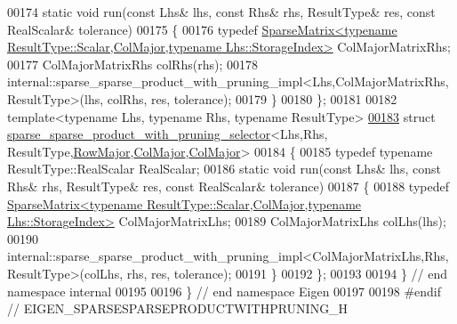 \begin{DoxyCode}
00174   \textcolor{keyword}{static} \textcolor{keywordtype}{void} run(\textcolor{keyword}{const} Lhs& lhs, \textcolor{keyword}{const} Rhs& rhs, ResultType& res, \textcolor{keyword}{const} RealScalar& tolerance)
00175   \{
00176     \textcolor{keyword}{typedef} 
      \hyperlink{group___sparse_core___module_class_eigen_1_1_sparse_matrix}{SparseMatrix<typename ResultType::Scalar,ColMajor,typename Lhs::StorageIndex>}
       ColMajorMatrixRhs;
00177     ColMajorMatrixRhs colRhs(rhs);
00178     internal::sparse\_sparse\_product\_with\_pruning\_impl<Lhs,ColMajorMatrixRhs,ResultType>(lhs, colRhs, res, 
      tolerance);
00179   \}
00180 \};
00181 
00182 \textcolor{keyword}{template}<\textcolor{keyword}{typename} Lhs, \textcolor{keyword}{typename} Rhs, \textcolor{keyword}{typename} ResultType>
\hyperlink{struct_eigen_1_1internal_1_1sparse__sparse__product__with__pruning__selector_3_01_lhs_00_01_rhs_a29c87f6ec217a6cab39d35f96e8e389}{00183} \textcolor{keyword}{struct }\hyperlink{struct_eigen_1_1internal_1_1sparse__sparse__product__with__pruning__selector}{sparse\_sparse\_product\_with\_pruning\_selector}<Lhs,Rhs,
      ResultType,\hyperlink{group__enums_ggaacded1a18ae58b0f554751f6cdf9eb13acfcde9cd8677c5f7caf6bd603666aae3}{RowMajor},\hyperlink{group__enums_ggaacded1a18ae58b0f554751f6cdf9eb13a0cbd4bdd0abcfc0224c5fcb5e4f6669a}{ColMajor},\hyperlink{group__enums_ggaacded1a18ae58b0f554751f6cdf9eb13a0cbd4bdd0abcfc0224c5fcb5e4f6669a}{ColMajor}>
00184 \{
00185   \textcolor{keyword}{typedef} \textcolor{keyword}{typename} ResultType::RealScalar RealScalar;
00186   \textcolor{keyword}{static} \textcolor{keywordtype}{void} run(\textcolor{keyword}{const} Lhs& lhs, \textcolor{keyword}{const} Rhs& rhs, ResultType& res, \textcolor{keyword}{const} RealScalar& tolerance)
00187   \{
00188     \textcolor{keyword}{typedef} 
      \hyperlink{group___sparse_core___module_class_eigen_1_1_sparse_matrix}{SparseMatrix<typename ResultType::Scalar,ColMajor,typename Lhs::StorageIndex>}
       ColMajorMatrixLhs;
00189     ColMajorMatrixLhs colLhs(lhs);
00190     internal::sparse\_sparse\_product\_with\_pruning\_impl<ColMajorMatrixLhs,Rhs,ResultType>(colLhs, rhs, res, 
      tolerance);
00191   \}
00192 \};
00193 
00194 \} \textcolor{comment}{// end namespace internal}
00195 
00196 \} \textcolor{comment}{// end namespace Eigen}
00197 
00198 \textcolor{preprocessor}{#endif // EIGEN\_SPARSESPARSEPRODUCTWITHPRUNING\_H}
\end{DoxyCode}
